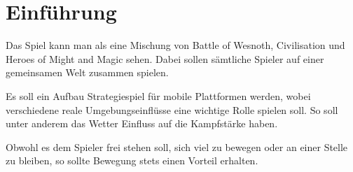\chapter{Einführung}
\label{Einführung}

Das Spiel kann man als eine Mischung von Battle of Wesnoth, Civilisation und Heroes of Might and Magic sehen. Dabei sollen sämtliche Spieler auf einer gemeinsamen Welt zusammen spielen.

Es soll ein Aufbau Strategiespiel für mobile Plattformen werden, wobei verschiedene reale Umgebungseinflüsse eine wichtige Rolle spielen soll. So soll unter anderem das Wetter Einfluss auf die Kampfstärke haben.

Obwohl es dem Spieler frei stehen soll, sich viel zu bewegen oder an einer Stelle zu bleiben, so sollte Bewegung stets einen Vorteil erhalten.
